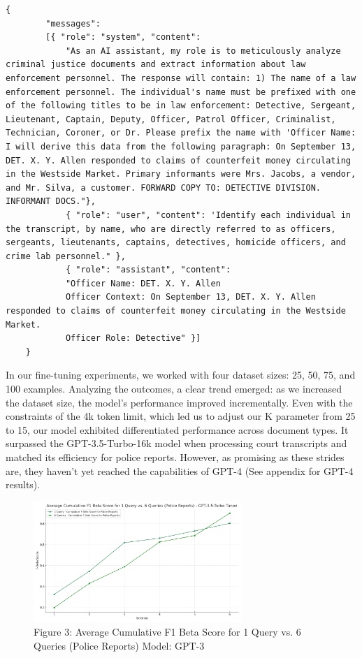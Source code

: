 \documentclass{article}
\begin{document}
\begin{lstlisting}[breaklines=true]
    { 
        "messages": 
        [{ "role": "system", "content": 
            "As an AI assistant, my role is to meticulously analyze criminal justice documents and extract information about law enforcement personnel. The response will contain: 1) The name of a law enforcement personnel. The individual's name must be prefixed with one of the following titles to be in law enforcement: Detective, Sergeant, Lieutenant, Captain, Deputy, Officer, Patrol Officer, Criminalist, Technician, Coroner, or Dr. Please prefix the name with 'Officer Name:  I will derive this data from the following paragraph: On September 13, DET. X. Y. Allen responded to claims of counterfeit money circulating in the Westside Market. Primary informants were Mrs. Jacobs, a vendor, and Mr. Silva, a customer. FORWARD COPY TO: DETECTIVE DIVISION. INFORMANT DOCS."}, 
            { "role": "user", "content": 'Identify each individual in the transcript, by name, who are directly referred to as officers, sergeants, lieutenants, captains, detectives, homicide officers, and crime lab personnel." }, 
            { "role": "assistant", "content": 
            "Officer Name: DET. X. Y. Allen
            Officer Context: On September 13, DET. X. Y. Allen responded to claims of counterfeit money circulating in the Westside Market. 
            Officer Role: Detective" }] 
    }
    \end{lstlisting}

In our fine-tuning experiments, we worked with four dataset sizes: 25, 50, 75, and 100 examples. Analyzing the outcomes, a clear trend emerged: as we increased the dataset size, the model's performance improved incrementally. Even with the constraints of the 4k token limit, which led us to adjust our K parameter from 25 to 15, our model exhibited differentiated performance across document types. It surpassed the GPT-3.5-Turbo-16k model when processing court transcripts and matched its efficiency for police reports. However, as promising as these strides are, they haven't yet reached the capabilities of GPT-4 (See appendix for GPT-4 results).

\begin{figure}[h]
    \centering
    \includegraphics[width=0.7\textwidth]{data/police_reports_graph_tuned.png}
    \caption{Figure 3: Average Cumulative F1 Beta Score for 1 Query vs. 6 Queries (Police Reports) Model: GPT-3}
\end{figure}
\end{document}
